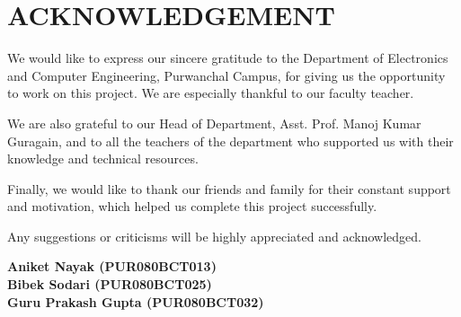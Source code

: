 \chapter*{ACKNOWLEDGEMENT}

We would like to express our sincere gratitude to the Department of Electronics and
Computer Engineering, Purwanchal Campus, for giving us the opportunity to work on
this project. We are especially thankful to our faculty teacher.

We are also grateful to our Head of Department, Asst. Prof. Manoj Kumar Guragain, and
to all the teachers of the department who supported us with their knowledge and
technical resources.

Finally, we would like to thank our friends and family for their constant support
and motivation, which helped us complete this project successfully.

Any suggestions or criticisms will be highly appreciated and acknowledged.

\vspace{0.5cm}
\textbf{Aniket Nayak (PUR080BCT013)}\\
\textbf{Bibek Sodari (PUR080BCT025)}\\
\textbf{Guru Prakash Gupta (PUR080BCT032)}

\vspace{1cm}


